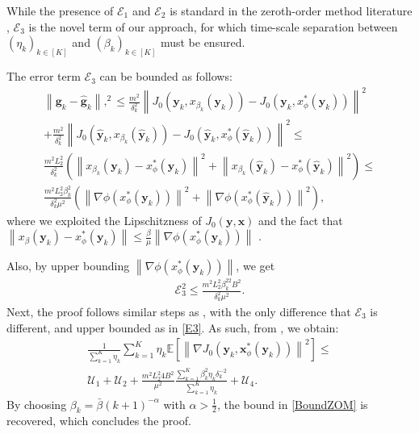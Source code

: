 \documentclass[letterpaper, 10 pt, conference]{ieeeconf}
\newcommand\gbf{\mathbf{g}}
\newcommand\xbf{\mathbf{x}}
\newcommand\ybf{\mathbf{y}}
\begin{document}
While the presence of $\mathcal{E}_1$ and $\mathcal{E}_2$ is standard in the zeroth-order method literature \cite[Theorem 1]{maheshwari2024follower}, $\mathcal{E}_3$ is the novel term of our approach, for which time-scale separation between $\left(\eta_k\right)_{k \in [K]}$ and $\left(\beta_k\right)_{k \in [K]}$ must be ensured. 

The error term $\mathcal{E}_3$ can be bounded as follows:
\begin{multline}
    \left\|\gbf_k-\hat{\gbf}_k\right\|,^2 \le \frac{m^2}{\delta_k^2} \left\|J_0(\ybf_k, x_{\beta_k}(\ybf_k))-J_0(\ybf_k, x_{\phi}^*(\ybf_k))\right\|^2 \\
    + \frac{m^2}{\delta_k^2}\left\|J_0(\hat{\ybf}_k, x_{\beta_k}(\hat{\ybf}_k))-J_0(\hat{\ybf}_k, x_{\phi}^*(\hat{\ybf}_k))\right\|^2 \le \\
    \frac{m^2L_2^2}{\delta_k^2} \left(\left\|x_{\beta_k}(\ybf_k)-x_\phi^*(\ybf_k)\right\|^2+\left\|x_{\beta_k}(\hat{\ybf}_k)-x_\phi^*(\hat{\ybf}_k)\right\|^2\right) \le \\ 
    \frac{m^2L_2^2\beta_k^2}{\delta_k^2 \mu^2} \left(\left\|\nabla\phi(x^*_\phi(\ybf_k))\right\|^2+\left\|\nabla\phi(x^*_\phi(\hat{\ybf}_k))\right\|^2\right),
\end{multline}
where we exploited the Lipschitzness of $J_0(\ybf, \xbf)$ and the fact that $\left\|x_\beta(\ybf_k)-x_\phi^*(\ybf_k)\right\|\le \frac{\beta}{\mu}\left\|\nabla \phi(x_\phi^*(\ybf_k))\right\|$ \cite[Theorem 12.2.5]{facchinei2003finite}.

Also, by upper bounding $\left\|\nabla \phi(x_\phi^*(\ybf_k))\right\|$, we get 
\begin{align}\label{E3}
\mathcal{E}_3^2 \le \frac{m^2L_2^2\beta_k^22B^2}{\delta_k^2 \mu^2}.
\end{align}
Next, the proof follows similar steps as \cite[Proof of Theorem 1]{maheshwari2024follower}, with the only difference that $\mathcal{E}_3$ is different, and upper bounded as in \eqref{E3}. As such, from \cite[Lemma 1, Lemma 2]{maheshwari2024follower}, we obtain:
\begin{multline*}
        \frac{1}{\sum_{k=1}^K \eta_k} \sum_{k=1}^K \eta_k \mathbb{E}\left[\left\|\nabla J_0(\ybf_k,\xbf^*_\phi(\ybf_k))\right\|^2\right]\le \\\mathcal{U}_1 + \mathcal{U}_2 + \frac{m^2L_2^2 4 B^2}{\mu^2 } \frac{\sum_{k=1}^K\beta_k^2\eta_k\delta_k^{-2}}{\sum_{k=1}^K\eta_k}+\mathcal{U}_4.
        \end{multline*}
By choosing $\beta_k=\bar{\beta}(k+1)^{-\alpha}$ with $\alpha > \frac{1}{2}$, the bound in \eqref{BoundZOM} is recovered, which concludes the proof.
\end{document}
